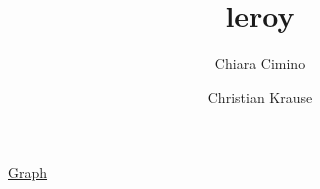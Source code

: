 \documentclass{report}
\title{leroy}
\author{Chiara Cimino \and Christian Krause}
\begin{document}
\maketitle
\href{dep_graph_document.html}{Graph}

\end{document}
